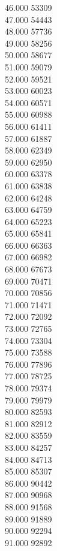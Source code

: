 { 46.000	53309 \\
 47.000	54443 \\
 48.000	57736 \\
 49.000	58256 \\
 50.000	58677 \\
 51.000	59079 \\
 52.000	59521 \\
 53.000	60023 \\
 54.000	60571 \\
 55.000	60988 \\
 56.000	61411 \\
 57.000	61887 \\
 58.000	62349 \\
 59.000	62950 \\
 60.000	63378 \\
 61.000	63838 \\
 62.000	64248 \\
 63.000	64759 \\
 64.000	65223 \\
 65.000	65841 \\
 66.000	66363 \\
 67.000	66982 \\
 68.000	67673 \\
 69.000	70471 \\
 70.000	70856 \\
 71.000	71471 \\
 72.000	72092 \\
 73.000	72765 \\
 74.000	73304 \\
 75.000	73588 \\
 76.000	77896 \\
 77.000	78725 \\
 78.000	79374 \\
 79.000	79979 \\
 80.000	82593 \\
 81.000	82912 \\
 82.000	83559 \\
 83.000	84257 \\
 84.000	84713 \\
 85.000	85307 \\
 86.000	90442 \\
 87.000	90968 \\
 88.000	91568 \\
 89.000	91889 \\
 90.000	92294 \\
 91.000	92892 \\
}
